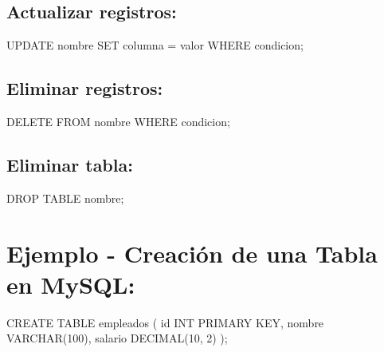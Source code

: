 \documentclass[
  a4paper,
  onepage,
  openany]{scrreprt}
\newenvironment{Shaded}{\begin{snugshade}}{\end{snugshade}}
\newcommand{\DataTypeTok}[1]{\textcolor[rgb]{0.68,0.00,0.00}{#1}}
\newcommand{\DecValTok}[1]{\textcolor[rgb]{0.68,0.00,0.00}{#1}}
\newcommand{\KeywordTok}[1]{\textcolor[rgb]{0.00,0.23,0.31}{#1}}
\newcommand{\NormalTok}[1]{\textcolor[rgb]{0.00,0.23,0.31}{#1}}
\newcommand{\OperatorTok}[1]{\textcolor[rgb]{0.37,0.37,0.37}{#1}}
\begin{document}
\hypertarget{actualizar-registros-2}{%
\subsection{Actualizar registros:}\label{actualizar-registros-2}}

\begin{Shaded}
\begin{Highlighting}[]
\KeywordTok{UPDATE}\NormalTok{ nombre }\KeywordTok{SET}\NormalTok{ columna }\OperatorTok{=}\NormalTok{ valor }\KeywordTok{WHERE}\NormalTok{ condicion;}
\end{Highlighting}
\end{Shaded}

\hypertarget{eliminar-registros-2}{%
\subsection{Eliminar registros:}\label{eliminar-registros-2}}

\begin{Shaded}
\begin{Highlighting}[]
\KeywordTok{DELETE} \KeywordTok{FROM}\NormalTok{ nombre }\KeywordTok{WHERE}\NormalTok{ condicion;}
\end{Highlighting}
\end{Shaded}

\hypertarget{eliminar-tabla}{%
\subsection{Eliminar tabla:}\label{eliminar-tabla}}

\begin{Shaded}
\begin{Highlighting}[]
\KeywordTok{DROP} \KeywordTok{TABLE}\NormalTok{ nombre;}
\end{Highlighting}
\end{Shaded}

\hypertarget{ejemplo---creaciuxf3n-de-una-tabla-en-mysql}{%
\section{Ejemplo - Creación de una Tabla en
MySQL:}\label{ejemplo---creaciuxf3n-de-una-tabla-en-mysql}}

\begin{Shaded}
\begin{Highlighting}[]
\KeywordTok{CREATE} \KeywordTok{TABLE}\NormalTok{ empleados (}
    \KeywordTok{id} \DataTypeTok{INT} \KeywordTok{PRIMARY} \KeywordTok{KEY}\NormalTok{,}
\NormalTok{    nombre }\DataTypeTok{VARCHAR}\NormalTok{(}\DecValTok{100}\NormalTok{),}
\NormalTok{    salario }\DataTypeTok{DECIMAL}\NormalTok{(}\DecValTok{10}\NormalTok{, }\DecValTok{2}\NormalTok{)}
\NormalTok{);}
\end{Highlighting}
\end{Shaded}
\end{document}
